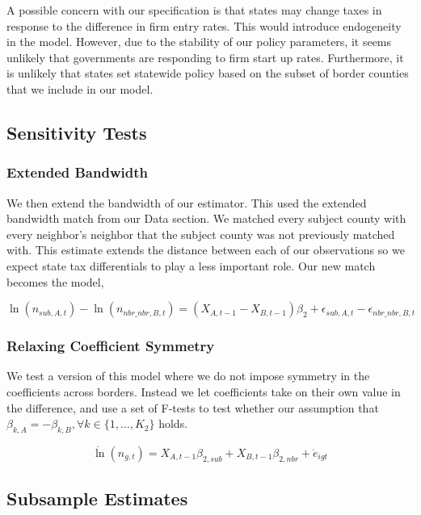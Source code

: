 A possible concern with our specification is that states may change taxes in response to the difference in firm entry rates.  This would introduce endogeneity in the model.  However, due to the stability of our policy parameters, it seems unlikely that governments are responding to firm start up rates.  Furthermore, it is unlikely that states set statewide policy based on the subset of border  counties that we include in our model.

\subsection{Sensitivity Tests}

\subsubsection{Extended Bandwidth}

We then extend the bandwidth of our estimator. This used the extended bandwidth match from our Data section. We matched every subject county with every neighbor's neighbor that the subject county was not previously matched with. This estimate extends the distance between each of our observations so we expect state tax differentials to play a less important role. Our new match becomes the model,

\begin{equation}
\ln(n_{sub,A,t})-\ln(n_{nbr\_nbr,B,t}) = (X_{A,t-1}-X_{B,t-1})\beta_{2} + \epsilon_{sub,A,t}-\epsilon_{nbr\_nbr,B,t}
\end{equation}

\subsubsection{Relaxing Coefficient Symmetry}
We test a version of this model where we do not impose symmetry in the coefficients across borders. Instead we let coefficients take on their own value in the difference, and use a set of F-tests to test whether our assumption that $\beta_{k,A} = - \beta_{k,B}, \forall k \in \{1,...,K_{2}\}$ holds. 

\begin{equation}\label{sense1}
\ddot \ln(n_{g,t}) = X_{A,t-1}\beta_{2,sub}+X_{B,t-1}\beta_{2,nbr}+ \ddot e_{igt} 
\end{equation}

\subsection{Subsample Estimates}

